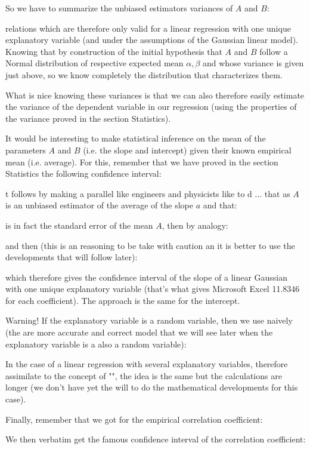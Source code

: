 	So we have to summarize the unbiased estimators variances of $A$ and $B$:
	
	relations which are therefore only valid for a linear regression with one unique explanatory variable (and under the assumptions of the Gaussian linear model). Knowing that by construction of the initial hypothesis that $A$ and $B$ follow a Normal distribution of respective expected mean $\alpha,\beta$ and whose variance is given just above, so we know completely the distribution that characterizes them.
	
	What is nice knowing these variances is that we can also therefore easily estimate the variance of the dependent variable in our regression (using the properties of the variance proved in the section Statistics).
	
	It would be interesting to make statistical inference on the mean of the parameters $A$ and $B$ (i.e. the slope and intercept) given their known empirical mean (i.e. average). For this, remember that we have proved in the section Statistics the following confidence interval:
	
	t follows by making a parallel like engineers and physicists like to d ... that as $A$ is an unbiased estimator of the average of the slope $a$ and that:
	
	is in fact the standard error of the mean $A$, then by analogy:
	
	and then (this is an reasoning to be take with caution an it is better to use the developments that will follow later):
	
	which therefore gives the confidence interval of the slope of a linear Gaussian with one unique explanatory variable (that's what gives Microsoft Excel 11.8346 for each coefficient). The approach is the same for the intercept.
	
	Warning! If the explanatory variable is a random variable, then we use naively (the are more accurate and correct model that we will see later when the explanatory variable is a also a random variable):
	
	
	In the case of a linear regression with several explanatory variables, therefore assimilate to the concept of "", the idea is the same but the calculations are longer (we don't have yet the will to do the mathematical developments for this case).
	
	Finally, remember that we got for the empirical correlation coefficient:
	
	We then verbatim get the famous confidence interval of the correlation coefficient:
	
